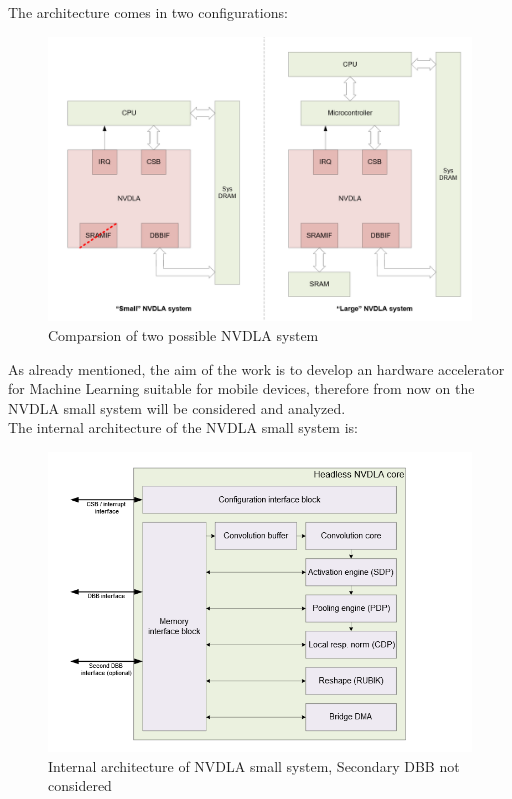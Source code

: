 The architecture comes in two configurations:

\begin{figure}[!htbp] 
\centering
\captionsetup{justification=centering}
  \includegraphics[scale=0.4]{./figure/nvdla_system.PNG}
\caption{Comparsion of two possible NVDLA system}
  \label{fig:nvdlasystem}
\end{figure} 
As already mentioned, the aim of the work is to develop an hardware accelerator for Machine Learning suitable for mobile devices, therefore from now on the NVDLA small system will be considered and analyzed.\\ 
The internal architecture of the NVDLA small system is: 
\begin{figure}[!htbp] 
\centering
\captionsetup{justification=centering}
  \includegraphics[scale=0.5]{./figure/nvdla_internal.PNG}
    \centering\caption{Internal architecture of NVDLA small system, Secondary DBB not considered}
  \label{fig:nvdlaarch}
\end{figure} 

